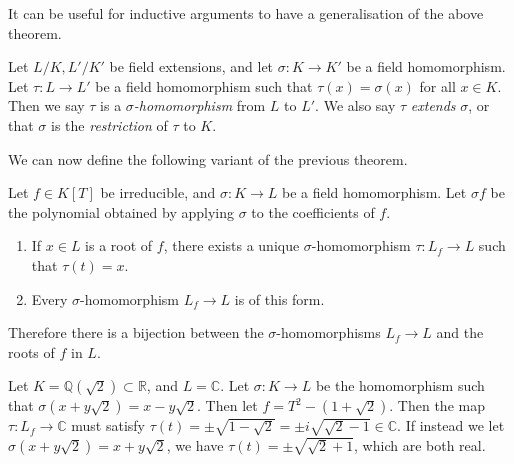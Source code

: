 It can be useful for inductive arguments to have a generalisation of the above theorem.
\begin{definition}
	Let \( L / K, L' / K' \) be field extensions, and let \( \sigma \colon K \to K' \) be a field homomorphism.
	Let \( \tau \colon L \to L' \) be a field homomorphism such that \( \tau(x) = \sigma(x) \) for all \( x \in K \).
	Then we say \( \tau \) is a \emph{\( \sigma \)-homomorphism} from \( L \) to \( L' \).
	We also say \( \tau \) \emph{extends} \( \sigma \), or that \( \sigma \) is the \emph{restriction} of \( \tau \) to \( K \).
\end{definition}
We can now define the following variant of the previous theorem.
\begin{theorem}
	Let \( f \in K[T] \) be irreducible, and \( \sigma \colon K \to L \) be a field homomorphism.
	Let \( \sigma f \) be the polynomial obtained by applying \( \sigma \) to the coefficients of \( f \).
	\begin{enumerate}
		\item If \( x \in L \) is a root of \( f \), there exists a unique \( \sigma \)-homomorphism \( \tau \colon L_f \to L \) such that \( \tau(t) = x \).
		\item Every \( \sigma \)-homomorphism \( L_f \to L \) is of this form.
	\end{enumerate}
	Therefore there is a bijection between the \( \sigma \)-homomorphisms \( L_f \to L \) and the roots of \( f \) in \( L \).
\end{theorem}
\begin{example}
	Let \( K = \mathbb Q(\sqrt 2) \subset \mathbb R \), and \( L = \mathbb C \).
	Let \( \sigma \colon K \to L \) be the homomorphism such that \( \sigma(x+y\sqrt 2) = x-y\sqrt 2 \).
	Then let \( f = T^2 - (1 + \sqrt 2) \).
	Then the map \( \tau \colon L_f \to \mathbb C \) must satisfy \( \tau(t) = \pm \sqrt{1 - \sqrt 2} = \pm i \sqrt{\sqrt 2 - 1} \in \mathbb C \).
	If instead we let \( \sigma(x+y\sqrt 2) = x+y\sqrt 2 \), we have \( \tau(t) = \pm\sqrt{\sqrt 2 + 1} \), which are both real.
\end{example}

